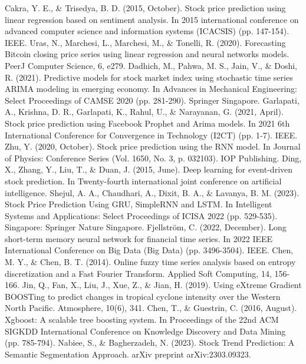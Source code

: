 \documentclass{ieeeojies}
\begin{document}
\begin{thebibliography}{00}
Cakra, Y. E., \& Trisedya, B. D. (2015, October). Stock price prediction using linear regression based on sentiment analysis. In 2015 international conference on advanced computer science and information systems (ICACSIS) (pp. 147-154). IEEE.
Uras, N., Marchesi, L., Marchesi, M., \& Tonelli, R. (2020). Forecasting Bitcoin closing price series using linear regression and neural networks models. PeerJ Computer Science, 6, e279.
Dadhich, M., Pahwa, M. S., Jain, V., \& Doshi, R. (2021). Predictive models for stock market index using stochastic time series ARIMA modeling in emerging economy. In Advances in Mechanical Engineering: Select Proceedings of CAMSE 2020 (pp. 281-290). Springer Singapore.
Garlapati, A., Krishna, D. R., Garlapati, K., Rahul, U., \& Narayanan, G. (2021, April). Stock price prediction using Facebook Prophet and Arima models. In 2021 6th International Conference for Convergence in Technology (I2CT) (pp. 1-7). IEEE.
Zhu, Y. (2020, October). Stock price prediction using the RNN model. In Journal of Physics: Conference Series (Vol. 1650, No. 3, p. 032103). IOP Publishing.
Ding, X., Zhang, Y., Liu, T., \& Duan, J. (2015, June). Deep learning for event-driven stock prediction. In Twenty-fourth international joint conference on artificial intelligence.
Shejul, A. A., Chaudhari, A., Dixit, B. A., \& Lavanya, B. M. (2023). Stock Price Prediction Using GRU, SimpleRNN and LSTM. In Intelligent Systems and Applications: Select Proceedings of ICISA 2022 (pp. 529-535). Singapore: Springer Nature Singapore.
Fjellström, C. (2022, December). Long short-term memory neural network for financial time series. In 2022 IEEE International Conference on Big Data (Big Data) (pp. 3496-3504). IEEE.
Chen, M. Y., \& Chen, B. T. (2014). Online fuzzy time series analysis based on entropy discretization and a Fast Fourier Transform. Applied Soft Computing, 14, 156-166.
Jin, Q., Fan, X., Liu, J., Xue, Z., \& Jian, H. (2019). Using eXtreme Gradient BOOSTing to predict changes in tropical cyclone intensity over the Western North Pacific. Atmosphere, 10(6), 341.
Chen, T., & Guestrin, C. (2016, August). Xgboost: A scalable tree boosting system. In Proceedings of the 22nd ACM SIGKDD International Conference on Knowledge Discovery and Data Mining (pp. 785-794).
Nabiee, S., \& Bagherzadeh, N. (2023). Stock Trend Prediction: A Semantic Segmentation Approach. arXiv preprint arXiv:2303.09323.



\end{thebibliography}
\end{document}
